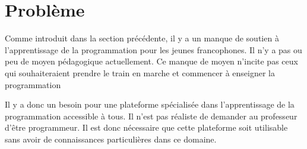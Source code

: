 \section{Problème}
\label{into-problem}
Comme introduit dans la section précédente, il y a un manque de soutien à l'apprentissage de la programmation pour les jeunes francophones. Il n'y a pas ou peu de moyen pédagogique actuellement. Ce manque de moyen n'incite pas ceux qui souhaiteraient prendre le train en marche et commencer à enseigner la programmation

Il y a donc un besoin pour une plateforme spécialisée dans l'apprentissage de la programmation accessible à tous. Il n'est pas réaliste de demander au professeur d'être programmeur. Il est donc nécessaire que cette plateforme soit utilisable sans avoir de connaissances particulières dans ce domaine.
